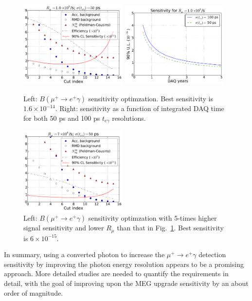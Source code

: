 \begin{figure}[htbp]
   \centering
   \includegraphics[width=0.48\textwidth]{Figures/muegamma-sens-1e9-1p5y-50ps.pdf} 
   \includegraphics[width=0.48\textwidth]{Figures/muegamma-sens-years-1e9-2.pdf} 
   \caption{Left: $B(\mu^+\to e^+\gamma)$ sensitivity optimzation. 
Best sensitivity is $1.6\times 10^{-14}$. Right: sensitivity as a function of integrated DAQ time for both 50 ps and 100 ps $t_{e\gamma}$ resolutions.}
   \label{fig:muegamma-sensitivity}
\end{figure}

\begin{figure}[htbp]
\centering
\includegraphics[width=0.48\textwidth]{Figures/muegamma-sens-7e8-1p5y-50ps-x5sigeff.pdf}
\caption{Left: $B(\mu^+\to e^+\gamma)$ sensitivity optimzation with 5-times
higher signal sensitivity and lower $R_\mu$ than that in 
Fig.~\ref{fig:muegamma-sensitivity}. Best sensitivity is $6\times 10^{-15}$.}
\label{fig:muegamma-sens-5x}
\end{figure}


In summary, using a converted photon to increase the $\mu^+\to e^+\gamma$ detection
sensitivity by improving the photon energy resolution appears to be a promising approach. More detailed studies are 
needed to quantify the requirements in detail, with the goal of improving upon the MEG upgrade
sensitivity by an about order of magnitude.
